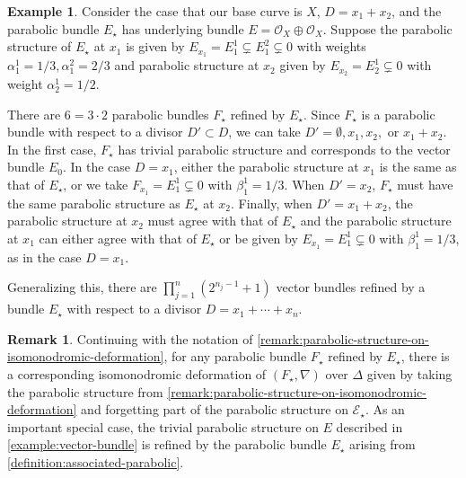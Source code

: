 \documentclass[12 pt]{amsart}
\theoremstyle{plain}
\theoremstyle{definition}
\newtheorem{remark}[subsubsection]{Remark}
\newtheorem{example}[subsubsection]{Example}
\theoremstyle{remark}
\numberwithin{equation}{section}
\begin{document}
\begin{example}
	\label{example:refinement}
	Consider the case that our base curve is $X$, $D = x_1 + x_2$, and
	the parabolic bundle $E_\star$ has underlying bundle $E = \mathscr O_X
	\oplus \mathscr O_X$.
	Suppose the parabolic structure of $E_\star$ at $x_1$ is given by
	$E_{x_1} = E_1^1 \subsetneq E_1^2 \subsetneq 0$ with weights $\alpha_1^1
	= 1/3, \alpha_1^2 = 2/3$ and parabolic structure at $x_2$ given by $E_{x_2} = E_2^1 \subsetneq 0$ with weight
	$\alpha_2^1 = 1/2$.

	There are $6 = 3 \cdot 2$ parabolic bundles $F_\star$ refined by $E_\star$.
	Since $F_\star$ is a parabolic bundle with respect to a divisor $D'
	\subset D$, we can take $D' = \emptyset, x_1, x_2,$ or $x_1+
	x_2$. In the first case, $F_\star$ has trivial parabolic structure and
	corresponds to the vector bundle $E_0$. In the case $D = x_1$, either
	the parabolic structure at $x_1$ is the same as that of $E_\star$, or we take 
	$F_{x_1} = E_1^1 \subsetneq 0$ with $\beta_1^1 = 1/3$.
	When $D' = x_2$, $F_\star$ must have the same parabolic structure as
	$E_\star$ at $x_2$. Finally, when $D' = x_1+ x_2$, the parabolic
	structure at $x_2$ must agree with that of $E_\star$ and the parabolic
	structure at $x_1$ can either agree with that of $E_\star$ or be given
	by $E_{x_1} = E_1^1 \subsetneq 0$ with $\beta_1^1 = 1/3$, as in the
	case $D = x_1$.

	Generalizing this, there are $\prod_{j=1}^n (2^{n_j-1}+1)$ vector bundles
	refined by a bundle $E_\star$ with respect to a divisor $D = x_1 +
	\cdots + x_n$.
\end{example}

\begin{remark}
	\label{remark:refinement}
	Continuing with the notation of
	\autoref{remark:parabolic-structure-on-isomonodromic-deformation},
	for any parabolic bundle $F_\star$ refined by $E_\star$,
	there is a corresponding
	isomonodromic deformation of $(F_\star,\nabla)$ over $\Delta$ given by taking the
	parabolic structure from 
	\autoref{remark:parabolic-structure-on-isomonodromic-deformation}
	and forgetting
	part of the parabolic structure on $\mathscr{E}_\star$.
	As an important special case, the trivial parabolic structure on $E$ described in \autoref{example:vector-bundle} is refined by the parabolic bundle  $E_\star$ arising from \autoref{definition:associated-parabolic}.
\end{remark}
\end{document}
